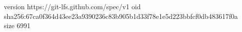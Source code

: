 version https://git-lfs.github.com/spec/v1
oid sha256:67ca0f364d43ee23a9390236c83b905b1d33f78e1e5d223bbfcf0db483617f0a
size 6991
